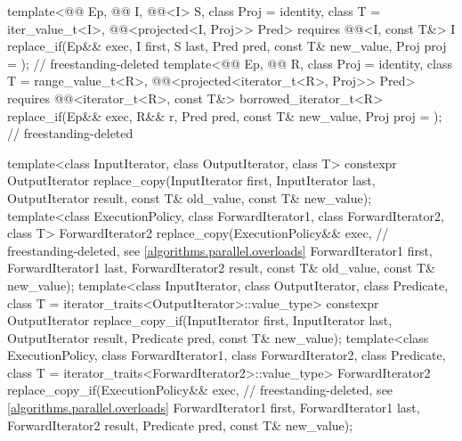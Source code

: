 \begin{codeblock}
{{    template<@@ Ep, @@ I, @@<I> S,
             class Proj = identity, class T = iter_value_t<I>,
             @@<projected<I, Proj>> Pred>
      requires @@<I, const T&>
      I replace_if(Ep&& exec, I first, S last, Pred pred,
                   const T& new_value, Proj proj = {});         // freestanding-deleted
    template<@@ Ep, @@ R, class Proj = identity,
             class T = range_value_t<R>,
             @@<projected<iterator_t<R>, Proj>> Pred>
      requires @@<iterator_t<R>, const T&>
      borrowed_iterator_t<R>
        replace_if(Ep&& exec, R&& r, Pred pred, const T& new_value,
                   Proj proj = {});                             // freestanding-deleted
  }

  template<class InputIterator, class OutputIterator, class T>
    constexpr OutputIterator replace_copy(InputIterator first, InputIterator last,
                                          OutputIterator result,
                                          const T& old_value, const T& new_value);
  template<class ExecutionPolicy, class ForwardIterator1, class ForwardIterator2, class T>
    ForwardIterator2 replace_copy(ExecutionPolicy&& exec,       // freestanding-deleted, see \ref{algorithms.parallel.overloads}
                                  ForwardIterator1 first, ForwardIterator1 last,
                                  ForwardIterator2 result,
                                  const T& old_value, const T& new_value);
  template<class InputIterator, class OutputIterator, class Predicate,
           class T = iterator_traits<OutputIterator>::value_type>
    constexpr OutputIterator replace_copy_if(InputIterator first, InputIterator last,
                                             OutputIterator result,
                                             Predicate pred, const T& new_value);
  template<class ExecutionPolicy, class ForwardIterator1, class ForwardIterator2,
           class Predicate, class T = iterator_traits<ForwardIterator2>::value_type>
    ForwardIterator2 replace_copy_if(ExecutionPolicy&& exec,    // freestanding-deleted, see \ref{algorithms.parallel.overloads}
                                     ForwardIterator1 first, ForwardIterator1 last,
                                     ForwardIterator2 result,
                                     Predicate pred, const T& new_value);

}
\end{codeblock}
